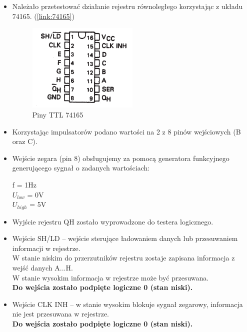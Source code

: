 \begin{itemize}
    \item Należało przetestować działanie rejestru równoległego korzystając z układu 74165. (\ref{link:74165})
        \begin{figure}[H]
            \centering
            \includegraphics[width=0.5\textwidth]{img/schemes/74165_pins.png}
            \caption{Piny TTL 74165}
            \label{rejestr_rownolegly:piny}
        \end{figure}
    \item Korzystając impulsatorów podano wartości na 2 z 8 pinów wejściowych (B oraz C).
    \item Wejście zegara (pin 8) obsługujemy za pomocą generatora funkcyjnego generującego sygnał o zadanych wartościach:
        \begin{center}
            f = 1Hz \\
            $U_{low}$ = 0V \\
            $U_{high}$ = 5V
        \end{center}
    \item Wyjście rejestru QH zostało wyprowadzone do testera logicznego.
    \item Wejście SH/LD – wejście sterujące ładowaniem danych lub przesuwaniem informacji w rejestrze. \\
        W stanie niskim do przerzutników rejestru zostaje zapisana informacja z wejść danych A...H. \\ 
        W stanie wysokim informacja w rejestrze może być przesuwana. \\
        \textbf{Do wejścia zostało podpięte logiczne 0 (stan niski).}
    \item Wejście CLK INH – w stanie wysokim blokuje sygnał zegarowy, informacja nie jest przesuwana w rejestrze. \\
        \textbf{Do wejścia zostało podpięte logiczne 0 (stan niski).}
        \begin{figure}[H]
            \centering

\end{figure}
\end{itemize}
